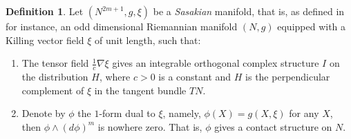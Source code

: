 \documentclass{amsart}
\numberwithin{equation}{section}
\theoremstyle{definition}
\newtheorem{definition}  [theorem]     {Definition}
\renewcommand{\1}{\mathds{1}}
\renewcommand{\>}{\rightarrow}
\begin{document}
\begin{definition}\label{SSK}
Let $(N^{2m+1},g,\xi)$ be a \textit{Sasakian} manifold, that is, as defined in \cite{YZZ} for instance, an odd dimensional Riemannian manifold $(N,g)$ equipped with a Killing vector field $\xi$ of unit length, such that:
\begin{enumerate}
\item The tensor field $\frac{1}{c}\nabla \xi$ gives an integrable orthogonal complex structure $I$ on the distribution $H$, where $c>0$ is a constant and $H$ is the perpendicular complement of $\xi $ in the tangent bundle $TN$.
\item Denote by $\phi $ the $1$-form dual to $\xi$, namely, $\phi (X) = g(X, \xi)$ for any $X$, then $\phi \wedge (d\phi )^m$ is nowhere zero.
That is, $\phi$ gives a contact structure on $N$.
\end{enumerate}
\end{definition}
\end{document}
